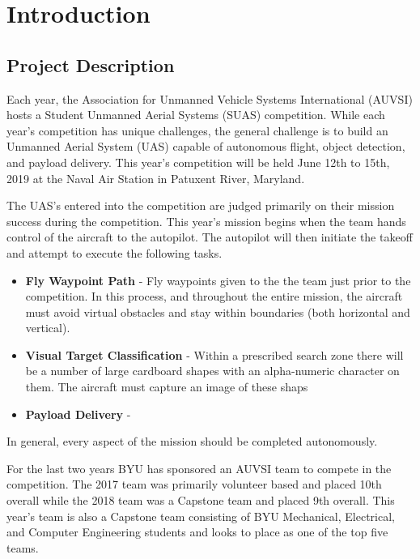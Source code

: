 \documentclass[]{auvsi_doc}
\begin{document}
\begin{AUVSITitlePage}
\begin{artifacttable}
\end{artifacttable}
\end{AUVSITitlePage}

\section{Introduction}
\subsection{Project Description}

Each year, the Association for Unmanned Vehicle Systems International (AUVSI) hosts a Student Unmanned Aerial Systems (SUAS) competition. While each year’s competition has unique challenges, the general challenge is to build an Unmanned Aerial System (UAS) capable of autonomous flight, object detection, and payload delivery. This year’s competition will be held June 12th to 15th, 2019 at the Naval Air Station in Patuxent River, Maryland.

The UAS's entered into the competition are judged primarily on their mission success during the competition. This year's mission begins when the team hands control of the aircraft to the autopilot. The autopilot will then initiate the takeoff and attempt to execute the following tasks.

\begin{itemize}
	\item\textbf{Fly Waypoint Path} - Fly waypoints given to the the team just prior to the competition. In this process, and throughout the entire mission, the aircraft must avoid virtual obstacles and stay within boundaries (both horizontal and vertical).
	\item\textbf{Visual Target Classification} - Within a prescribed search zone there will be a number of large cardboard shapes with an alpha-numeric character on them. The aircraft must capture an image of these shaps
	\item\textbf{Payload Delivery} -
\end{itemize}

In general, every aspect of the mission should be completed autonomously.

For the last two years BYU has sponsored an AUVSI team to compete in the competition. The 2017 team was primarily volunteer based and placed 10th overall while the 2018 team was a Capstone team and placed 9th overall. This year’s team is also a Capstone team consisting of BYU Mechanical, Electrical, and Computer Engineering students and looks to place as one of the top five teams.
\end{document}
